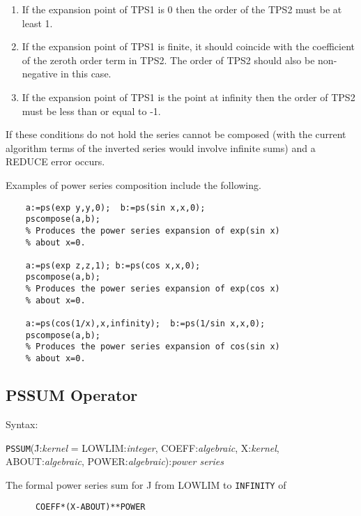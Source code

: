 \begin{enumerate}
\item If the expansion point of TPS1 is 0 then the order of the
TPS2 must be at least 1.

\item If the expansion point of TPS1 is finite, it should
coincide with the coefficient of the zeroth order term in TPS2.
The order of TPS2 should also be non-negative in this case.

\item If the expansion point of TPS1 is the point at infinity
then the order of TPS2 must be less than or equal to -1.

\end{enumerate}

If these conditions do not hold the series cannot be composed (with
the current algorithm terms of the inverted series would involve
infinite sums) and a REDUCE error occurs.

\noindent Examples of power series composition include the following.

\begin{verbatim}
    a:=ps(exp y,y,0);  b:=ps(sin x,x,0); 
    pscompose(a,b);
    % Produces the power series expansion of exp(sin x)
    % about x=0.

    a:=ps(exp z,z,1); b:=ps(cos x,x,0);
    pscompose(a,b);
    % Produces the power series expansion of exp(cos x)
    % about x=0.

    a:=ps(cos(1/x),x,infinity);  b:=ps(1/sin x,x,0);
    pscompose(a,b);
    % Produces the power series expansion of cos(sin x)
    % about x=0.
\end{verbatim}

\subsection{PSSUM Operator}

Syntax:

\begin{tabbing}
\hspace*{2em} {\tt PSSUM}(\=J:{\em kernel} = LOWLIM:{\em integer},
COEFF:{\em algebraic}, X:{\em kernel}, \\ 
\> ABOUT:{\em algebraic}, POWER:{\em algebraic}):{\em power series}
\end{tabbing}

The formal power series sum for J from LOWLIM to {\tt INFINITY} of 

\begin{verbatim}
      COEFF*(X-ABOUT)**POWER
\end{verbatim}

